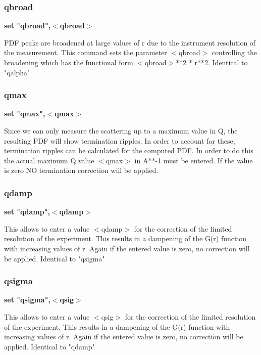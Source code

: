 \subsubsection{qbroad}
{\bf set "qbroad",$ <$qbroad$> $ \par }
\par
\vspace{3pt}
PDF peaks are broadened at large values of r due to the instrument 
resolution of the measurement. This command sets the parameter 
$ <$qbroad$> $ controlling the broadening which has the functional form 
$ <$qbroad$> $**2 * r**2. 
Identical to "qalpha" 
\subsubsection{qmax}
{\bf set "qmax",$ <$qmax$> $ \par }
\par
\vspace{3pt}
Since we can only measure the scattering up to a maximum value 
in Q, the resulting PDF will show termination ripples. In order to 
account for these, termination ripples can be calculated for the 
computed PDF. In order to do this the actual maximum Q value 
$ <$qmax$> $ in A**-1 must be entered. If the value is zero NO termination 
correction will be applied. 
\subsubsection{qdamp}
{\bf set "qdamp",$ <$qdamp$> $ \par }
\par
\vspace{3pt}
This allows to enter a value $ <$qdamp$> $ for the correction of the 
limited resolution of the experiment. This results in a dampening 
of the G(r) function with increasing values of r. Again if the 
entered value is zero, no correction will be applied. 
Identical to "qsigma" 
\subsubsection{qsigma}
{\bf set "qsigma",$ <$qsig$> $ \par }
\par
\vspace{3pt}
This allows to enter a value $ <$qsig$> $ for the correction of the 
limited resolution of the experiment. This results in a dampening 
of the G(r) function with increasing values of r. Again if the 
entered value is zero, no correction will be applied. 
Identical to "qdamp" 
